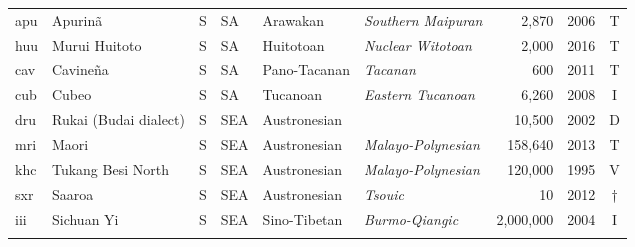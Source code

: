 \begin{table}
\begin{tabularx}{\textwidth}{lQllQQrlc}
 apu & {{Apurinã}} & S & SA & {Arawakan} & {\textit{Southern Maipuran}} &  2,870 & 2006 & T\\
 huu & {{Murui Huitoto}} & S & SA & {Huitotoan} & {\textit{Nuclear Witotoan}} &  2,000 & 2016 & T\\
 cav & {{Cavineña}} & S & SA & {Pano-Tacanan} & {\textit{Tacanan}} &  600 & 2011 & T\\
 cub & {{Cubeo}} & S & SA & {Tucanoan} & {\textit{Eastern Tucanoan}} &  6,260 & 2008 & I\\
 dru & {{Rukai (Budai dialect)}} & S & SEA & {Austronesian} &  &  10,500 & 2002 & D\\
 mri & {{Maori}} & S & SEA  & {Austronesian} & {\textit{Malayo-Polynesian}} &  158,640 & 2013 & T\\
 khc & {{Tukang Besi North}} & S & SEA  & {Austronesian} & {\textit{Malayo-Polynesian}} &  120,000 & 1995 & V\\
 sxr & {{Saaroa}} & S & SEA  & {Austronesian} & {\textit{Tsouic}} &  10 & 2012 & †\\
 iii & {{Sichuan Yi}} & S & SEA & {Sino-Tibetan} & {\textit{Burmo-Qiangic}} &  2,000,000 & 2004 & I\\
 \lspbottomrule
\end{tabularx}
\end{table}



